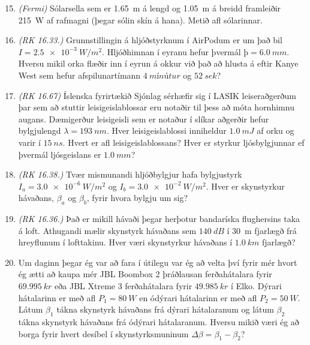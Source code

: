 \ifdefined \wholebook \else\documentclass[oneside]{book}\usepackage{EdlBook}\graphicspath{{figures/}}
\begin{document}
\begin{enumerate}[label = \textbf{Dæmi \thechapter.\arabic*.}]

\setcounter{enumi}{14}

\item  \textit{(Fermi)} Sólarsella sem er \SI{1,65}{m} á lengd og \SI{1,05}{m} á breidd framleiðir \SI{215}{W} af rafmagni (þegar
sólin skín á hana). Metið afl sólarinnar.

\item \textit{(RK 16.33.)} Grunnstillingin á hljóðstyrknum í AirPodum er um það bil $I = \SI{2.5e-3}{W/m^2}$. Hljóðhimnan í eyranu hefur þvermál $þ = \SI{6.0}{mm}$. Hversu mikil orka flæðir inn í eyrun á okkur við það að hlusta á  eftir Kanye West sem hefur afspilunartímann $\SI{4}{mínútur}$ og $\SI{52}{sek}$?

\item \textit{(RK 16.67)} Íslenska fyrirtækið Sjónlag sérhæfir sig í LASIK leiseraðgerðum þar sem að stuttir leisigeislablossar eru notaðir til þess að móta hornhimnu augans. Dæmigerður leisigeisli sem er notaður í slíkar aðgerðir hefur bylgjulengd $\lambda = \SI{193}{nm}$. Hver leisigeislablossi inniheldur $\SI{1.0}{mJ}$ af orku og varir í $\SI{15}{ns}$. Hvert er afl leisigeislablossans? Hver er styrkur ljósbylgjunnar ef þvermál ljósgeislans er $\SI{1.0}{mm}$?


\item \textit{(RK 16.38.)} Tvær mismunandi hljóðbylgjur hafa bylgjustyrk $I_a = \SI{3.0e-6}{W/m^2}$ og $I_b = \SI{3.0e-2}{W/m^2}$. Hver er skynstyrkur hávaðans, $\beta_a$ og $\beta_b$, fyrir hvora bylgju um sig?

\item \textit{(RK 16.36.)} Það er mikill hávaði þegar herþotur bandaríska flughersins taka á loft. Athugandi mælir skynstyrk hávaðans sem $\SI{140}{dB}$ í \SI{30}{m} fjarlægð frá hreyflunum í lofttakinu. Hver væri skynstyrkur hávaðans í $\SI{1.0}{km}$ fjarlægð?

\item Um daginn þegar ég var að fara í útilegu var ég að velta því fyrir mér hvort ég ætti að kaupa mér JBL Boombox 2 þráðlausan ferðahátalara fyrir $\SI{69.995}{kr}$ eða JBL Xtreme 3 ferðahátalara fyrir $\SI{49.985}{kr}$ í Elko. Dýrari hátalarinn er með afl $P_1 = \SI{80}{W}$ en ódýrari hátalarinn er með afl $P_2 = \SI{50}{W}$. Látum $\beta_1$ tákna skynstyrk hávaðans frá dýrari hátalaranum og látum $\beta_2$ tákna skynstyrk hávaðans frá ódýrari hátalaranum. Hversu mikið væri ég að borga fyrir hvert desíbel í skynstyrksmuninum $\Delta \beta = \beta_1 - \beta_2$?


\end{enumerate}
\end{document}
